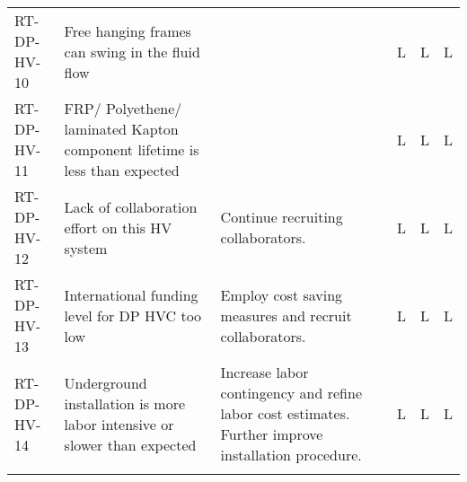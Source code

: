 \begin{footnotesize}
\begin{longtable}{P{0.18\textwidth}P{0.20\textwidth}P{0.32\textwidth}P{0.02\textwidth}P{0.02\textwidth}P{0.02\textwidth}}
RT-DP-HV-10 & Free hanging frames can swing in the fluid flow &  & L & L & L \\  \colhline
RT-DP-HV-11 & FRP/ Polyethene/ laminated Kapton component lifetime is less than expected &  & L & L & L \\  \colhline
RT-DP-HV-12 & Lack of collaboration effort on this HV system & Continue recruiting collaborators. & L & L & L \\  \colhline
RT-DP-HV-13 & International funding level for DP HVC too low & Employ cost saving measures and  recruit collaborators. & L & L & L \\  \colhline
RT-DP-HV-14 & Underground installation is more labor intensive or slower than expected & Increase labor contingency and refine labor cost estimates. Further improve installation procedure. & L & L & L \\  \colhline

\label{tab:risks:DP-FD-HV}
\end{longtable}
\end{footnotesize}